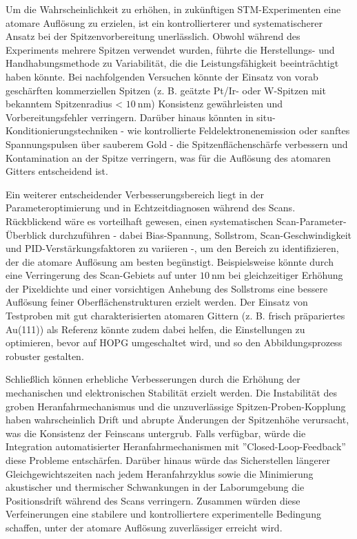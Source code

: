 Um die Wahrscheinlichkeit zu erhöhen, in zukünftigen STM-Experimenten eine atomare Auflösung zu erzielen, ist ein kontrollierterer und systematischerer Ansatz bei der Spitzenvorbereitung unerlässlich. 
Obwohl während des Experiments mehrere Spitzen verwendet wurden, führte die Herstellungs- und Handhabungsmethode zu Variabilität, die die Leistungsfähigkeit beeinträchtigt haben könnte. 
Bei nachfolgenden Versuchen könnte der Einsatz von vorab geschärften kommerziellen Spitzen (z. B. geätzte Pt/Ir- oder W-Spitzen mit bekanntem Spitzenradius < $\SI{10}{\nm}$) Konsistenz gewährleisten und Vorbereitungsfehler verringern. 
Darüber hinaus könnten in situ-Konditionierungs\-techniken - wie kontrollierte Feldelektronenemission oder sanftes Spannungspulsen über sauberem Gold - die Spitzenflächenschärfe verbessern und Kontamination an der Spitze verringern, was für die Auflösung des atomaren Gitters entscheidend ist.

Ein weiterer entscheidender Verbesserungsbereich liegt in der Parameteroptimierung und in Echtzeitdiagnosen während des Scans. Rückblickend wäre es vorteilhaft gewesen, einen systematischen Scan-Parameter-Überblick durchzuführen - dabei Bias-Spannung, Sollstrom, Scan-Geschwindigkeit und PID-Verstärkungsfaktoren zu variieren -, um den Bereich zu identifizieren, der die atomare Auflösung am besten begünstigt. 
Beispielsweise könnte durch eine Verringerung des Scan-Gebiets auf unter $\SI{10}{\nm}$ bei gleichzeitiger Erhöhung der Pixeldichte und einer vorsichtigen Anhebung des Sollstroms eine bessere Auflösung feiner Oberflächenstrukturen erzielt werden. Der Einsatz von Testproben mit gut charakterisierten atomaren Gittern (z. B. frisch präpariertes Au(111)) als Referenz könnte zudem dabei helfen, die Einstellungen zu optimieren, bevor auf HOPG umgeschaltet wird, und so den Abbildungsprozess robuster gestalten.

Schließlich können erhebliche Verbesserungen durch die Erhöhung der mechanischen und elektronischen Stabilität erzielt werden. Die Instabilität des groben Heranfahrmechanismus und die unzuverlässige Spitzen-Proben-Kopplung haben wahrscheinlich Drift und abrupte Änderungen der Spitzenhöhe verursacht, was die Konsistenz der Feinscans untergrub. 
Falls verfügbar, würde die Integration automatisierter Heranfahrmechanismen mit ''Closed-Loop-Feedback'' diese Probleme entschärfen. Darüber hinaus würde das Sicherstellen längerer Gleichgewichtszeiten nach jedem Heranfahrzyklus sowie die Minimierung akustischer und thermischer Schwankungen in der Laborumgebung die Positionsdrift während des Scans verringern. 
Zusammen würden diese Verfeinerungen eine stabilere und kontrolliertere experimentelle Bedingung schaffen, unter der atomare Auflösung zuverlässiger erreicht wird.

